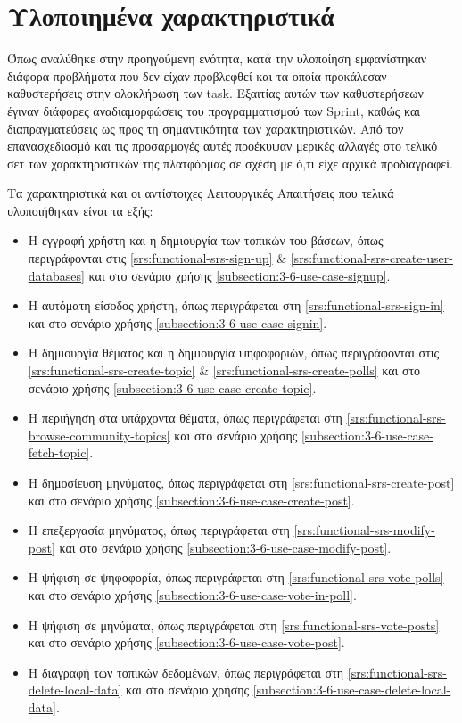 \section{Υλοποιημένα χαρακτηριστικά} \label{section:4-5-implemented-parts}

Όπως αναλύθηκε στην προηγούμενη ενότητα, κατά την υλοποίηση εμφανίστηκαν διάφορα προβλήματα που δεν είχαν προβλεφθεί και τα οποία προκάλεσαν καθυστερήσεις στην ολοκλήρωση των task. Εξαιτίας αυτών των καθυστερήσεων έγιναν διάφορες αναδιαμορφώσεις του προγραμματισμού των Sprint, καθώς και διαπραγματεύσεις ως προς τη σημαντικότητα των χαρακτηριστικών. Από τον επανασχεδιασμό και τις προσαρμογές αυτές προέκυψαν μερικές αλλαγές στο τελικό σετ των χαρακτηριστικών της πλατφόρμας σε σχέση με ό,τι είχε αρχικά προδιαγραφεί.

Τα χαρακτηριστικά και οι αντίστοιχες Λειτουργικές Απαιτήσεις που τελικά υλοποιήθηκαν είναι τα εξής:

\begin{itemize}
    \item Η εγγραφή χρήστη και η δημιουργία των τοπικών του βάσεων, όπως περιγράφονται στις \ref{srs:functional-srs-sign-up} \& \ref{srs:functional-srs-create-user-databases} και στο σενάριο χρήσης \ref{subsection:3-6-use-case-signup}.
    \item Η αυτόματη είσοδος χρήστη, όπως περιγράφεται στη \ref{srs:functional-srs-sign-in} και στο σενάριο χρήσης \ref{subsection:3-6-use-case-signin}.
    \item Η δημιουργία θέματος και η δημιουργία ψηφοφοριών, όπως περιγράφονται στις \ref{srs:functional-srs-create-topic} \& \ref{srs:functional-srs-create-polls} και στο σενάριο χρήσης \ref{subsection:3-6-use-case-create-topic}.
    \item Η περιήγηση στα υπάρχοντα θέματα, όπως περιγράφεται στη \ref{srs:functional-srs-browse-community-topics} και στο σενάριο χρήσης \ref{subsection:3-6-use-case-fetch-topic}.
    \item Η δημοσίευση μηνύματος, όπως περιγράφεται στη \ref{srs:functional-srs-create-post} και στο σενάριο χρήσης \ref{subsection:3-6-use-case-create-post}.
    \item Η επεξεργασία μηνύματος, όπως περιγράφεται στη \ref{srs:functional-srs-modify-post} και στο σενάριο χρήσης \ref{subsection:3-6-use-case-modify-post}.
    \item Η ψήφιση σε ψηφοφορία, όπως περιγράφεται στη \ref{srs:functional-srs-vote-polls} και στο σενάριο χρήσης \ref{subsection:3-6-use-case-vote-in-poll}.
    \item Η ψήφιση σε μηνύματα, όπως περιγράφεται στη \ref{srs:functional-srs-vote-posts} και στο σενάριο χρήσης \ref{subsection:3-6-use-case-vote-post}.
    \item Η διαγραφή των τοπικών δεδομένων, όπως περιγράφεται στη \ref{srs:functional-srs-delete-local-data} και στο σενάριο χρήσης \ref{subsection:3-6-use-case-delete-local-data}.
\end{itemize}

